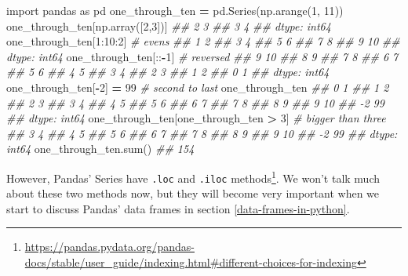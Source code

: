 \documentclass[
  12pt,
]{krantz}
\makeatletter
\newenvironment{Shaded}{\begin{snugshade}}{\end{snugshade}}
\newcommand{\BuiltInTok}[1]{#1}
\newcommand{\CommentTok}[1]{\textcolor[rgb]{0.37,0.37,0.37}{\textit{#1}}}
\newcommand{\DecValTok}[1]{\textcolor[rgb]{0.06,0.06,0.06}{#1}}
\newcommand{\ImportTok}[1]{#1}
\newcommand{\NormalTok}[1]{#1}
\newcommand{\OperatorTok}[1]{\textcolor[rgb]{0.43,0.43,0.43}{\textbf{#1}}}
\renewcommand{\href}[2]{#2\footnote{\url{#1}}}
\newenvironment{kframe}{%
\medskip{}
\setlength{\fboxsep}{.8em}
 \def\at@end@of@kframe{}%
 \ifinner\ifhmode%
  \def\at@end@of@kframe{\end{minipage}}%
  \begin{minipage}{\columnwidth}%
 \fi\fi%
 \def\FrameCommand##1{\hskip\@totalleftmargin \hskip-\fboxsep
 \colorbox{shadecolor}{##1}\hskip-\fboxsep
     \hskip-\linewidth \hskip-\@totalleftmargin \hskip\columnwidth}%
 \MakeFramed {\advance\hsize-\width
   \@totalleftmargin\z@ \linewidth\hsize
   \@setminipage}}%
 {\par\unskip\endMakeFramed%
 \at@end@of@kframe}
\renewenvironment{Shaded}{\begin{kframe}}{\end{kframe}}
\makeatother
\begin{document}
\begin{Shaded}
\begin{Highlighting}[]
\ImportTok{import}\NormalTok{ pandas }\ImportTok{as}\NormalTok{ pd}
\NormalTok{one\_through\_ten }\OperatorTok{=}\NormalTok{ pd.Series(np.arange(}\DecValTok{1}\NormalTok{, }\DecValTok{11}\NormalTok{))}
\NormalTok{one\_through\_ten[np.array([}\DecValTok{2}\NormalTok{,}\DecValTok{3}\NormalTok{])]}
\CommentTok{\#\# 2    3}
\CommentTok{\#\# 3    4}
\CommentTok{\#\# dtype: int64}
\NormalTok{one\_through\_ten[}\DecValTok{1}\NormalTok{:}\DecValTok{10}\NormalTok{:}\DecValTok{2}\NormalTok{] }\CommentTok{\# evens}
\CommentTok{\#\# 1     2}
\CommentTok{\#\# 3     4}
\CommentTok{\#\# 5     6}
\CommentTok{\#\# 7     8}
\CommentTok{\#\# 9    10}
\CommentTok{\#\# dtype: int64}
\NormalTok{one\_through\_ten[::}\OperatorTok{{-}}\DecValTok{1}\NormalTok{] }\CommentTok{\# reversed}
\CommentTok{\#\# 9    10}
\CommentTok{\#\# 8     9}
\CommentTok{\#\# 7     8}
\CommentTok{\#\# 6     7}
\CommentTok{\#\# 5     6}
\CommentTok{\#\# 4     5}
\CommentTok{\#\# 3     4}
\CommentTok{\#\# 2     3}
\CommentTok{\#\# 1     2}
\CommentTok{\#\# 0     1}
\CommentTok{\#\# dtype: int64}
\NormalTok{one\_through\_ten[}\OperatorTok{{-}}\DecValTok{2}\NormalTok{] }\OperatorTok{=} \DecValTok{99} \CommentTok{\# second to last}
\NormalTok{one\_through\_ten}
\CommentTok{\#\#  0     1}
\CommentTok{\#\#  1     2}
\CommentTok{\#\#  2     3}
\CommentTok{\#\#  3     4}
\CommentTok{\#\#  4     5}
\CommentTok{\#\#  5     6}
\CommentTok{\#\#  6     7}
\CommentTok{\#\#  7     8}
\CommentTok{\#\#  8     9}
\CommentTok{\#\#  9    10}
\CommentTok{\#\# {-}2    99}
\CommentTok{\#\# dtype: int64}
\NormalTok{one\_through\_ten[one\_through\_ten }\OperatorTok{\textgreater{}} \DecValTok{3}\NormalTok{] }\CommentTok{\# bigger than three}
\CommentTok{\#\#  3     4}
\CommentTok{\#\#  4     5}
\CommentTok{\#\#  5     6}
\CommentTok{\#\#  6     7}
\CommentTok{\#\#  7     8}
\CommentTok{\#\#  8     9}
\CommentTok{\#\#  9    10}
\CommentTok{\#\# {-}2    99}
\CommentTok{\#\# dtype: int64}
\NormalTok{one\_through\_ten.}\BuiltInTok{sum}\NormalTok{()}
\CommentTok{\#\# 154}
\end{Highlighting}
\end{Shaded}

However, \href{https://pandas.pydata.org/pandas-docs/stable/user_guide/indexing.html\#different-choices-for-indexing}{Pandas' Series have \texttt{.loc} and \texttt{.iloc} methods}. We won't talk much about these two methods now, but they will become very important when we start to discuss Pandas' data frames in section \ref{data-frames-in-python}.
\end{document}
